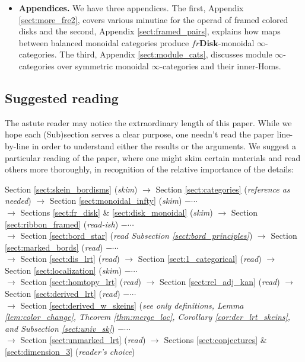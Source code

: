 \documentclass[reqno]{amsart}
\theoremstyle{definition}
\newcommand{\Disk}{\mathbf{Disk}}
\renewcommand{\1}{\mathbf{1}}
\begin{document}
\begin{itemize}
\item {\bf Appendices.} We have three appendices. The first, Appendix \ref{sect:more_fre2}, covers various minutiae for the operad of framed colored disks and the second, Appendix \ref{sect:framed_pairs}, explains how maps between balanced monoidal categories produce $fr\Disk$-monoidal $\infty$-categories. The third, Appendix \ref{sect:module_cats}, discusses module $\infty$-categories over symmetric monoidal $\infty$-categories and their inner-Homs.
\end{itemize}

\subsection{Suggested reading}
The astute reader may notice the extraordinary length of this paper. While we hope each (Sub)section serves a clear purpose, one needn't read the paper line-by-line in order to understand either the results or the arguments. We suggest a particular reading of the paper, where one might skim certain materials and read others more thoroughly, in recognition of the relative importance of the details:\vspace{1mm}
\begin{center}
Section \ref{sect:skein_bordisms} (\emph{skim}) $\to$ Section \ref{sect:categories} (\emph{reference as needed}) $\to$ Section \ref{sect:monoidal_infty} (\emph{skim}) $-\!\cdots$\vspace{2mm}\\
$\to$ Sections \ref{sect:fr_disk} \& \ref{sect:disk_monoidal} (\emph{skim}) $\to$ Section \ref{sect:ribbon_framed} (\emph{read-ish}) $-\!\cdots$\vspace{2mm}\\
$\to$ Section \ref{sect:bord_star} (\emph{read Subsection \ref{sect:bord_principles}}) $\to$ Section \ref{sect:marked_bords} (\emph{read}) $-\!\cdots$\vspace{2mm}\\
$\to$ Section \ref{sect:dis_lrt} (\emph{read}) $\to$ Section \ref{sect:1_categorical} (\emph{read}) $\to$ Section \ref{sect:localization} (\emph{skim}) $-\!\cdots$\vspace{2mm}\\
$\to$ Section \ref{sect:homtopy_lrt} (\emph{read}) $\to$ Section \ref{sect:rel_adj_kan} (\emph{read}) $\to$ Section \ref{sect:derived_lrt} (\emph{read}) $-\!\cdots$\vspace{2mm}\\
$\to$ Section \ref{sect:derived_w_skeins} (\emph{see only definitions, Lemma \ref{lem:color_change}, Theorem \ref{thm:merge_loc}, Corollary \ref{cor:der_lrt_skeins}, and Subsection \ref{sect:univ_sk}}) $-\!\cdots$\vspace{2mm}\\
$\to$ Section \ref{sect:unmarked_lrt} (\emph{read}) $\to$ Sections \ref{sect:conjectures} \& \ref{sect:dimension_3} (\emph{reader's choice}) 
\end{center}
\end{document}
